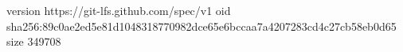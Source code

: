 version https://git-lfs.github.com/spec/v1
oid sha256:89c0ae2ed5e81d1048318770982dce65e6bccaa7a4207283cd4c27cb58eb0d65
size 349708
